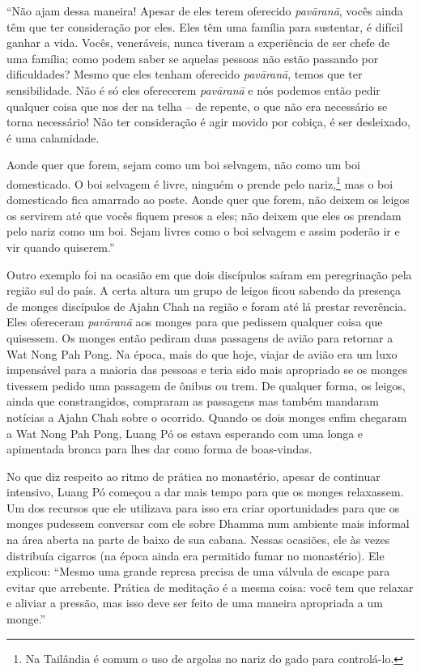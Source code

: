 ``Não ajam dessa maneira! Apesar de eles terem oferecido
\emph{pavāranā}, vocês ainda têm que ter consideração por eles. Eles têm
uma família para sustentar, é difícil ganhar a vida. Vocês, veneráveis,
nunca tiveram a experiência de ser chefe de uma família; como podem
saber se aquelas pessoas não estão passando por dificuldades? Mesmo que
eles tenham oferecido \emph{pavāranā}, temos que ter sensibilidade. Não
é só eles oferecerem \emph{pavāranā} e nós podemos então pedir qualquer
coisa que nos der na telha -- de repente, o que não era necessário se
torna necessário! Não ter consideração é agir movido por cobiça, é ser
desleixado, é uma calamidade.

Aonde quer que forem, sejam como um boi selvagem, não como um boi
domesticado. O boi selvagem é livre, ninguém o prende pelo
nariz,\footnote{Na Tailândia é comum o uso de argolas no nariz do gado
  para controlá-lo.} mas o boi domesticado fica amarrado ao poste.
Aonde quer que forem, não deixem os leigos os servirem até que vocês
fiquem presos a eles; não deixem que eles os prendam pelo nariz como um
boi. Sejam livres como o boi selvagem e assim poderão ir e vir quando
quiserem.''

Outro exemplo foi na ocasião em que dois discípulos saíram em
peregrinação pela região sul do país. A certa altura um grupo de leigos
ficou sabendo da presença de monges discípulos de Ajahn Chah na região e
foram até lá prestar reverência. Eles ofereceram \emph{pavāranā} aos
monges para que pedissem qualquer coisa que quisessem. Os monges então
pediram duas passagens de avião para retornar a Wat Nong Pah Pong. Na
época, mais do que hoje, viajar de avião era um luxo impensável para a
maioria das pessoas e teria sido mais apropriado se os monges tivessem
pedido uma passagem de ônibus ou trem. De qualquer forma, os leigos,
ainda que constrangidos, compraram as passagens mas também mandaram
notícias a Ajahn Chah sobre o ocorrido. Quando os dois monges enfim
chegaram a Wat Nong Pah Pong, Luang Pó os estava esperando com uma longa
e apimentada bronca para lhes dar como forma de boas-vindas.

No que diz respeito ao ritmo de prática no monastério, apesar de
continuar intensivo, Luang Pó começou a dar mais tempo para que os
monges relaxassem. Um dos recursos que ele utilizava para isso era criar
oportunidades para que os monges pudessem conversar com ele sobre Dhamma
num ambiente mais informal na área aberta na parte de baixo de sua
cabana. Nessas ocasiões, ele às vezes distribuía cigarros (na época
ainda era permitido fumar no monastério). Ele explicou: ``Mesmo uma
grande represa precisa de uma válvula de escape para evitar que
arrebente. Prática de meditação é a mesma coisa: você tem que relaxar e
aliviar a pressão, mas isso deve ser feito de uma maneira apropriada a
um monge.''

